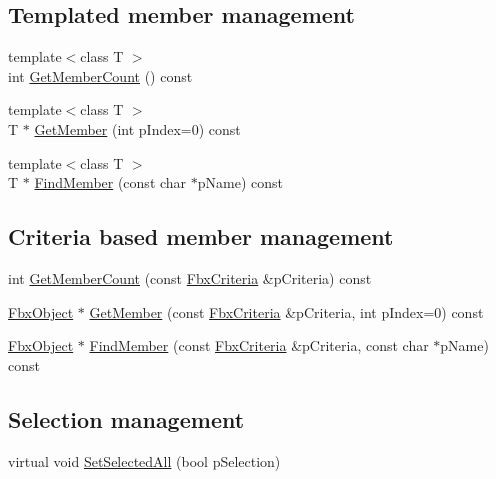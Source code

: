 \subsection*{Templated member management}
\begin{DoxyCompactItemize}
\item 
{\footnotesize template$<$class T $>$ }\\int \hyperlink{class_fbx_collection_a0bc6b29ae68a76d65c554c7217432cca}{Get\+Member\+Count} () const
\item 
{\footnotesize template$<$class T $>$ }\\T $\ast$ \hyperlink{class_fbx_collection_a36af3c2dc008c0c6261ff29b492eaee0}{Get\+Member} (int p\+Index=0) const
\item 
{\footnotesize template$<$class T $>$ }\\T $\ast$ \hyperlink{class_fbx_collection_ac68aa37ee6d89cb3cc066ca1407cb505}{Find\+Member} (const char $\ast$p\+Name) const
\end{DoxyCompactItemize}
\subsection*{Criteria based member management}
\begin{DoxyCompactItemize}
\item 
int \hyperlink{class_fbx_collection_ab885c6a1cc7eb77b471ae11c65658258}{Get\+Member\+Count} (const \hyperlink{class_fbx_criteria}{Fbx\+Criteria} \&p\+Criteria) const
\item 
\hyperlink{class_fbx_object}{Fbx\+Object} $\ast$ \hyperlink{class_fbx_collection_a0734fa6462dbc0926b610dfc6047252e}{Get\+Member} (const \hyperlink{class_fbx_criteria}{Fbx\+Criteria} \&p\+Criteria, int p\+Index=0) const
\item 
\hyperlink{class_fbx_object}{Fbx\+Object} $\ast$ \hyperlink{class_fbx_collection_a72875fa801308b233f5e1cb04cf66bb4}{Find\+Member} (const \hyperlink{class_fbx_criteria}{Fbx\+Criteria} \&p\+Criteria, const char $\ast$p\+Name) const
\end{DoxyCompactItemize}
\subsection*{Selection management}
\begin{DoxyCompactItemize}
\item 
virtual void \hyperlink{class_fbx_collection_a93caba5f2a0bded8cb00fca4001950e9}{Set\+Selected\+All} (bool p\+Selection)
\end{DoxyCompactItemize}
